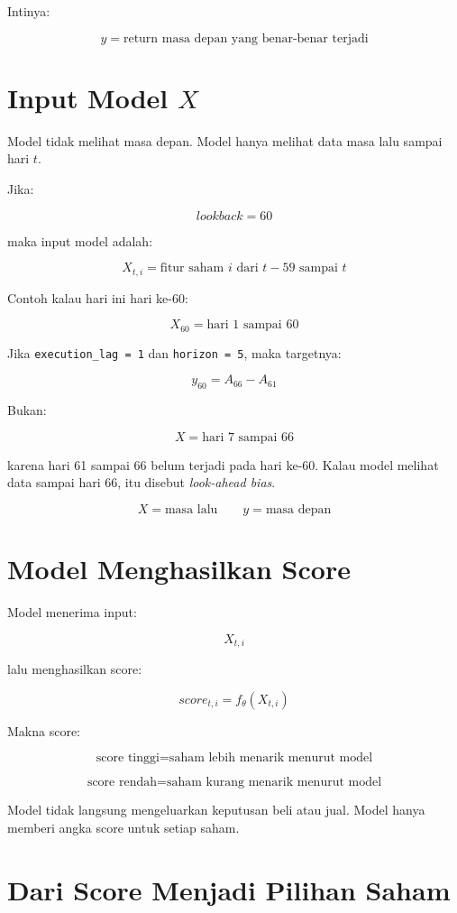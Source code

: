 \documentclass[11pt,a4paper]{article}
\begin{document}
Intinya:

\[
\boxed{
y = \text{return masa depan yang benar-benar terjadi}
}
\]

\section{Input Model \texorpdfstring{$X$}{X}}

Model tidak melihat masa depan. Model hanya melihat data masa lalu sampai hari \(t\).

Jika:

\[
lookback = 60
\]

maka input model adalah:

\[
\boxed{
X_{t,i} = \text{fitur saham } i \text{ dari } t-59 \text{ sampai } t
}
\]

Contoh kalau hari ini hari ke-60:

\[
X_{60} = \text{hari 1 sampai 60}
\]

Jika \texttt{execution\_lag = 1} dan \texttt{horizon = 5}, maka targetnya:

\[
y_{60} = A_{66} - A_{61}
\]

Bukan:

\[
X = \text{hari 7 sampai 66}
\]

karena hari 61 sampai 66 belum terjadi pada hari ke-60.
Kalau model melihat data sampai hari 66, itu disebut \textit{look-ahead bias}.

\[
\boxed{
X = \text{masa lalu}
\qquad
y = \text{masa depan}
}
\]

\section{Model Menghasilkan Score}

Model menerima input:

\[
X_{t,i}
\]

lalu menghasilkan score:

\[
\boxed{
score_{t,i} = f_\theta(X_{t,i})
}
\]

Makna score:

\[
\boxed{
\text{score tinggi} = \text{saham lebih menarik menurut model}
}
\]

\[
\boxed{
\text{score rendah} = \text{saham kurang menarik menurut model}
}
\]

Model tidak langsung mengeluarkan keputusan beli atau jual.
Model hanya memberi angka score untuk setiap saham.

\section{Dari Score Menjadi Pilihan Saham}
\end{document}
